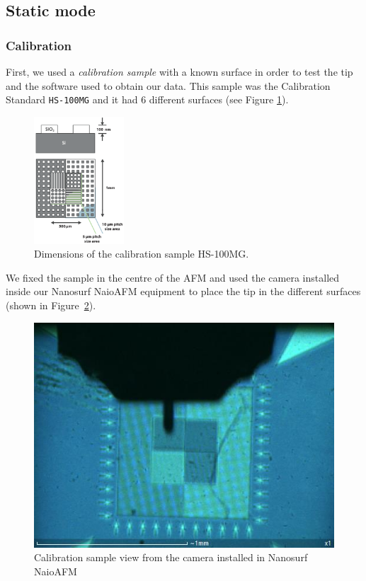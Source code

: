 \documentclass[11pt,a4paper]{article}
\begin{document}
\subsection{Static mode}
\subsubsection{Calibration}
First, we used a \emph{calibration sample} with a known surface in order to test the tip and the software used to obtain our data. This sample was the Calibration Standard \texttt{HS-100MG} and it had 6 different surfaces (see Figure \ref{fig:HS-100MG}).

\begin{figure}[H]
\centering
\includegraphics[width=0.3\textwidth]{HS-100MG}
\caption{Dimensions of the calibration sample HS-100MG.}
\label{fig:HS-100MG}
\end{figure}

We fixed the sample in the centre of the AFM and used the camera installed inside our Nanosurf NaioAFM equipment to place the tip in the different surfaces (shown in Figure~\ref{fig:cal_sam}).

\begin{figure}[ht]
\centering
\includegraphics[scale=0.4]{calibration_sample.JPG}
\caption{Calibration sample view from the camera installed in Nanosurf NaioAFM}
\label{fig:cal_sam}
\end{figure}
\end{document}
